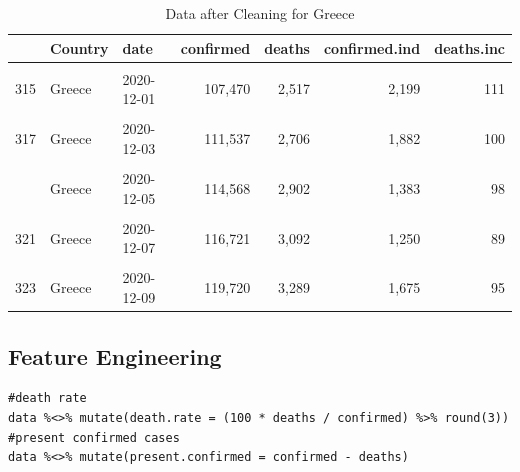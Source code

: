 \begin{table}[!h]
\caption{\label{tab:}Data after Cleaning for Greece}
\centering
\begin{tabular}[t]{lllrrrr}
\toprule
  & Country & date & confirmed & deaths & confirmed.ind & deaths.inc\\
\midrule
\cellcolor{gray!6}{314} & \cellcolor{gray!6}{Greece} & \cellcolor{gray!6}{2020-11-30} & \cellcolor{gray!6}{105,271} & \cellcolor{gray!6}{2,406} & \cellcolor{gray!6}{1,044} & \cellcolor{gray!6}{85}\\
315 & Greece & 2020-12-01 & 107,470 & 2,517 & 2,199 & 111\\
\cellcolor{gray!6}{316} & \cellcolor{gray!6}{Greece} & \cellcolor{gray!6}{2020-12-02} & \cellcolor{gray!6}{109,655} & \cellcolor{gray!6}{2,606} & \cellcolor{gray!6}{2,185} & \cellcolor{gray!6}{89}\\
317 & Greece & 2020-12-03 & 111,537 & 2,706 & 1,882 & 100\\
\cellcolor{gray!6}{318} & \cellcolor{gray!6}{Greece} & \cellcolor{gray!6}{2020-12-04} & \cellcolor{gray!6}{113,185} & \cellcolor{gray!6}{2,804} & \cellcolor{gray!6}{1,648} & \cellcolor{gray!6}{98}\\
\addlinespace
319 & Greece & 2020-12-05 & 114,568 & 2,902 & 1,383 & 98\\
\cellcolor{gray!6}{320} & \cellcolor{gray!6}{Greece} & \cellcolor{gray!6}{2020-12-06} & \cellcolor{gray!6}{115,471} & \cellcolor{gray!6}{3,003} & \cellcolor{gray!6}{903} & \cellcolor{gray!6}{101}\\
321 & Greece & 2020-12-07 & 116,721 & 3,092 & 1,250 & 89\\
\cellcolor{gray!6}{322} & \cellcolor{gray!6}{Greece} & \cellcolor{gray!6}{2020-12-08} & \cellcolor{gray!6}{118,045} & \cellcolor{gray!6}{3,194} & \cellcolor{gray!6}{1,324} & \cellcolor{gray!6}{102}\\
323 & Greece & 2020-12-09 & 119,720 & 3,289 & 1,675 & 95\\
\bottomrule
\end{tabular}
\end{table}


\clearpage
\subsection{Feature Engineering}

\begin{verbatim}
#death rate
data %<>% mutate(death.rate = (100 * deaths / confirmed) %>% round(3))
#present confirmed cases
data %<>% mutate(present.confirmed = confirmed - deaths)
\end{verbatim}

